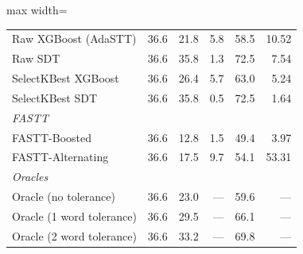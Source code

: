 \begin{table}[t]
\begin{adjustbox}{max width=\linewidth}
\begin{tabular}{lrrrrr}
        Raw XGBoost (AdaSTT) & 36.6 & 21.8 & 5.8 & 58.5 & 10.52 \\
        Raw SDT & 36.6 & 35.8 & 1.3 & 72.5 & 7.54 \\
        SelectKBest XGBoost & 36.6 & 26.4 & 5.7 & 63.0 & 5.24 \\
        SelectKBest SDT & 36.6 & 35.8 & 0.5 & 72.5 & 1.64 \\
        \midrule \multicolumn{6}{l}{\textit{FASTT}} \\
        FASTT-Boosted & 36.6 & 12.8 & 1.5 & 49.4 & 3.97 \\
        FASTT-Alternating & 36.6 & 17.5 & 9.7 & 54.1 & 53.31 \\
        \midrule \multicolumn{6}{l}{\textit{Oracles}} \\
        Oracle (no tolerance) & 36.6 & 23.0 & --- & 59.6 & --- \\
        Oracle (1 word tolerance) & 36.6 & 29.5 & --- & 66.1 & --- \\
        Oracle (2 word tolerance) & 36.6 & 33.2 & --- & 69.8 & --- \\
        \bottomrule
    \end{tabular}
    \end{adjustbox}
\end{table}
